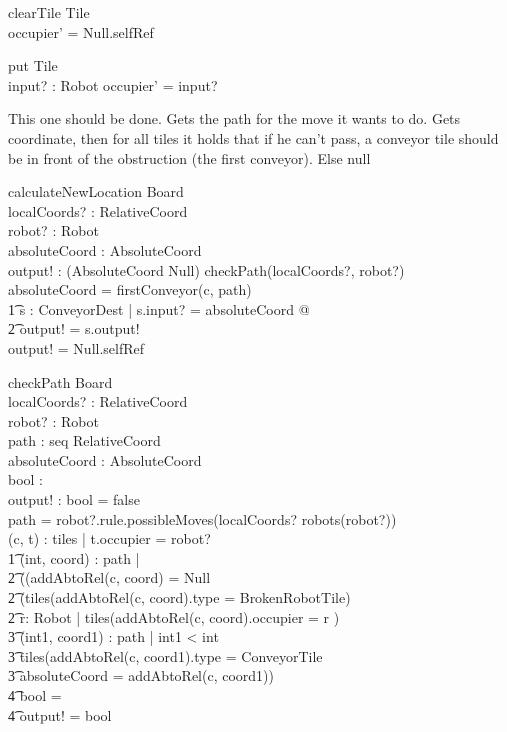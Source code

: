 \documentclass[a4paper,11pt]{article}
\begin{document}
\begin{schema}{clearTile}
\Delta Tile \\
\where
occupier' = Null.selfRef
\end{schema}

\begin{schema}{put}
\Delta Tile \\
input? : Robot
\where
occupier' = input?
\end{schema}

This one should be done. Gets the path for the move it wants to do. Gets coordinate, then for all tiles it holds that if he can't pass, a conveyor tile should be in front of the obstruction (the first conveyor). Else null
\begin{schema}{calculateNewLocation}
\Xi Board \\
localCoords? : RelativeCoord \\
robot? : Robot \\
absoluteCoord : AbsoluteCoord \\
output! : (AbsoluteCoord \union Null) 
\where
\IF checkPath(localCoords?, robot?) \\
\THEN absoluteCoord = firstConveyor(c, path) \\ \t1
\exists s : ConveyorDest | s.input? = absoluteCoord @ \\ \t2
output! = s.output! \\
\ELSE output! = Null.selfRef
\end{schema}

\begin{schema}{checkPath}
\Xi Board \\
localCoords? : RelativeCoord \\
robot? : Robot \\
path : seq RelativeCoord \\
absoluteCoord : AbsoluteCoord \\
bool : \bool \\
output! : \bool
\where
bool = false \\
path = robot?.rule.possibleMoves(localCoords? \cross robots(robot?)) \\
\exists (c, t) : tiles | t.occupier = robot? \implies \\ \t1
\forall (int, coord) : path | \\ \t2
((addAbtoRel(c, coord) = Null \vee \\ \t2
(tiles(addAbtoRel(c, coord).type = BrokenRobotTile) \vee \\ \t2
\exists r: Robot | tiles(addAbtoRel(c, coord).occupier = r )\implies \\ \t3
\exists (int1, coord1) : path | int1 < int \\ \t3
tiles(addAbtoRel(c, coord1).type = ConveyorTile \\ \t3
absoluteCoord = addAbtoRel(c, coord1)) \implies \\ \t4
bool = \true \\ \t4
output! = bool
\end{schema}
\end{document}
